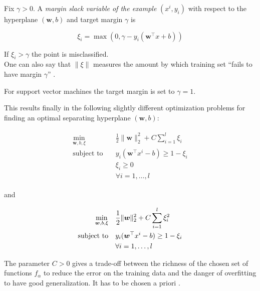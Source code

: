
Fix \(\gamma > 0\). A \emph{margin slack variable of the example} \((x^i,y_i)\) with respect to the hyperplane \((\bm{w},b)\) and target margin \(\gamma\) is 

\[\xi_i = \max(0, \gamma - y_i(\bm{w}^{\top}x+b))\] 

If \(\xi_i > \gamma\) the point is misclassified. \\
One can also say that \(\|\xi\|\) measures the amount by which training set ``fails to have margin \(\gamma\)'' \cite{Cristianini2000}.

For support vector machines the target margin is set to \(\gamma = 1\).

This results finally in the following slightly different optimization problems for finding an optimal separating hyperplane \((\bm{w},b)\): 

\begin{align}
\begin{split}
	\min_{\bm{w},b,\xi} \quad & \frac{1}{2} \|\bm{w}\|^2_2+C\sum_{i=1}^l{\xi_i} \\
	\text{subject to} \quad & y_i(\bm{w}^{\top}x^i-b) \geq 1 - \xi_i \\
	& \xi_i \geq 0 \\
	& 	\forall i = 1, \dots , l
\end{split}
\label{SVM_1}
\end{align}

and

\begin{align}
\begin{split}
	\min_{\bm{w},b,\xi} \quad & \frac{1}{2} \|\bm{w}\|^2_2+C\sum_{i=1}^l{\xi_i^2} \vspace{0.5ex}\\
	\text{subject to} \quad & y_i(\bm{w}^{\top}x^i-b) \geq 1 - \xi_i \vspace{0.5ex}\\
	& 	\forall i = 1, \dots , l
\end{split}
\label{SVM_2}
\end{align}


The parameter \(C > 0\) gives a trade-off between the richness of the chosen set of functions \(f_{\alpha}\) to reduce the error on the training data and the danger of overfitting to have good generalization. It has to be chosen a priori \cite{Kunapuli2008}.


